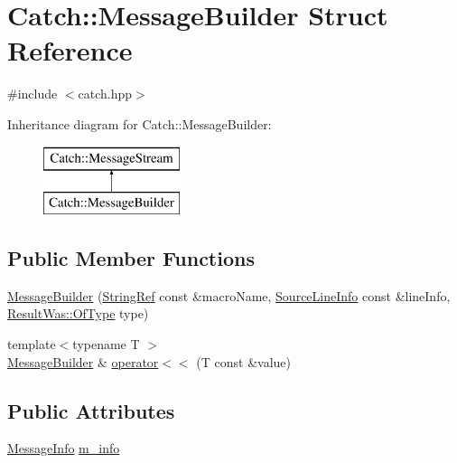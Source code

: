 \hypertarget{struct_catch_1_1_message_builder}{}\section{Catch\+:\+:Message\+Builder Struct Reference}
\label{struct_catch_1_1_message_builder}


{\ttfamily \#include $<$catch.\+hpp$>$}

Inheritance diagram for Catch\+:\+:Message\+Builder\+:\begin{figure}[H]
\begin{center}
\leavevmode
\includegraphics[height=2.000000cm]{struct_catch_1_1_message_builder}
\end{center}
\end{figure}
\subsection*{Public Member Functions}
\begin{DoxyCompactItemize}
\item 
\mbox{\hyperlink{struct_catch_1_1_message_builder_ac34832ca527a758f000ac233d32dd068}{Message\+Builder}} (\mbox{\hyperlink{class_catch_1_1_string_ref}{String\+Ref}} const \&macro\+Name, \mbox{\hyperlink{struct_catch_1_1_source_line_info}{Source\+Line\+Info}} const \&line\+Info, \mbox{\hyperlink{struct_catch_1_1_result_was_a624e1ee3661fcf6094ceef1f654601ef}{Result\+Was\+::\+Of\+Type}} type)
\item 
{\footnotesize template$<$typename T $>$ }\\\mbox{\hyperlink{struct_catch_1_1_message_builder}{Message\+Builder}} \& \mbox{\hyperlink{struct_catch_1_1_message_builder_a20fa48d069b20dddcc2d3df8abb123c1}{operator$<$$<$}} (T const \&value)
\end{DoxyCompactItemize}
\subsection*{Public Attributes}
\begin{DoxyCompactItemize}
\item 
\mbox{\hyperlink{struct_catch_1_1_message_info}{Message\+Info}} \mbox{\hyperlink{struct_catch_1_1_message_builder_a979f1c2b36d78f80ee275bfa5ba0209f}{m\+\_\+info}}
\end{DoxyCompactItemize}


